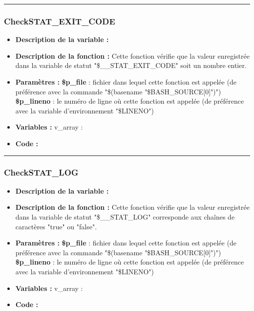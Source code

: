 \documentclass[a4paper,10pt]{article}
\begin{document}
\color{blue}\par\noindent\rule{\textwidth}{0.4pt}\color{white}

\color{blue}
\subsubsection{CheckSTAT\_EXIT\_CODE}\color{white}
\begin{itemize}
    \item \textbf{Description de la variable :}

    \item \textbf{Description de la fonction :} Cette fonction vérifie que la valeur enregistrée dans la variable de statut "\$\_\_STAT\_EXIT\_CODE" soit un nombre entier.

    \item \textbf{Paramètres :}
        \color{orange}\textbf{\$p\_file}\color{white} : fichier dans lequel cette fonction est appelée (de préférence avec la commande "\$(\color{gray}basename \color{white}"\color{orange}\$BASH\_SOURCE[0]\color{white}")")
    \color{orange}\textbf{\$p\_lineno}\color{white} : le numéro de ligne où cette fonction est appelée (de préférence avec la variable d'environnement "\color{orange}\$LINENO\color{white}")

    \item \textbf{Variables :} v\_array :

    \item \textbf{Code :}
\end{itemize}



\color{blue}\par\noindent\rule{\textwidth}{0.4pt}\color{white}

\color{blue}
\subsubsection{CheckSTAT\_LOG}\color{white}
\begin{itemize}
    \item \textbf{Description de la variable :}

    \item \textbf{Description de la fonction :} Cette fonction vérifie que la valeur enregistrée dans la variable de statut "\$\_\_STAT\_LOG" corresponde aux chaînes de caractères "true" ou "false".

    \item \textbf{Paramètres :}
        \color{orange}\textbf{\$p\_file}\color{white} : fichier dans lequel cette fonction est appelée (de préférence avec la commande "\$(\color{gray}basename \color{white}"\color{orange}\$BASH\_SOURCE[0]\color{white}")")
    \color{orange}\textbf{\$p\_lineno}\color{white} : le numéro de ligne où cette fonction est appelée (de préférence avec la variable d'environnement "\color{orange}\$LINENO\color{white}")

    \item \textbf{Variables :} v\_array :

    \item \textbf{Code :}
\end{itemize}
\end{document}

